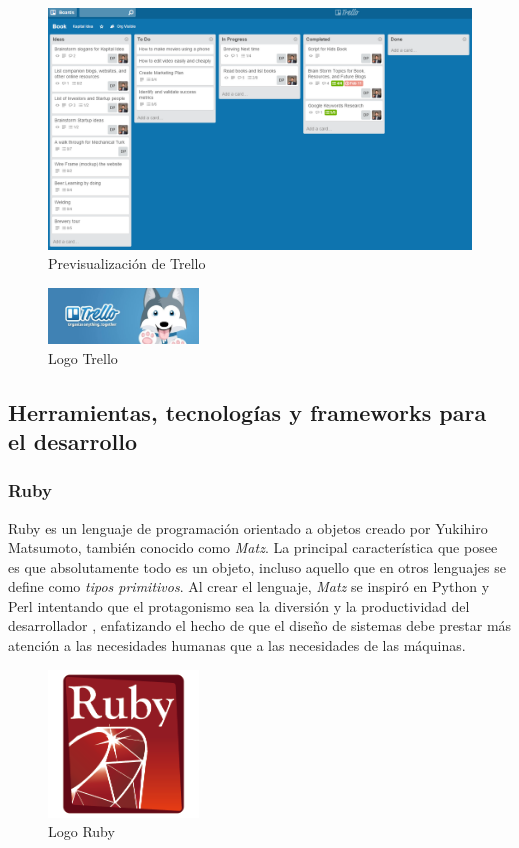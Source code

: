 		\begin{figure}[H]
		\centering
		\includegraphics[width=120mm, fbox={\fboxrule} 4mm]{images/04-metodo/20-trello_preview.png}
		\caption{Previsualización de Trello}
		\label{fig:trello-preview}
		\end{figure}
		
		\begin{figure}[H]
		\centering
		\includegraphics[width=40mm, fbox={\fboxrule} 4mm]{images/04-metodo/21-trello_logo.jpg}
		\caption{Logo Trello}
		\label{fig:trello-logo}
		\end{figure}
		
	\subsection{Herramientas, tecnologías y frameworks para el desarrollo}
		\subsubsection{Ruby}
		Ruby es un lenguaje de programación orientado a objetos creado por Yukihiro Matsumoto, también conocido como \textit{Matz}. La principal característica que posee es que absolutamente todo es un objeto, incluso aquello que en otros lenguajes se define como \textit{tipos primitivos}. Al crear el lenguaje, \textit{Matz} se inspiró en Python y Perl intentando que el protagonismo sea la diversión y la productividad del desarrollador \cite{Yuki20}, enfatizando el hecho de que el diseño de sistemas debe prestar más atención a las necesidades humanas que a las necesidades de las máquinas.
		
		\begin{figure}[H]
		\centering
		\includegraphics[width=40mm, fbox={\fboxrule} 4mm]{images/04-metodo/06-ruby_logo.png}
		\caption{Logo Ruby}
		\label{fig:ruby-logo}
		\end{figure}
		
